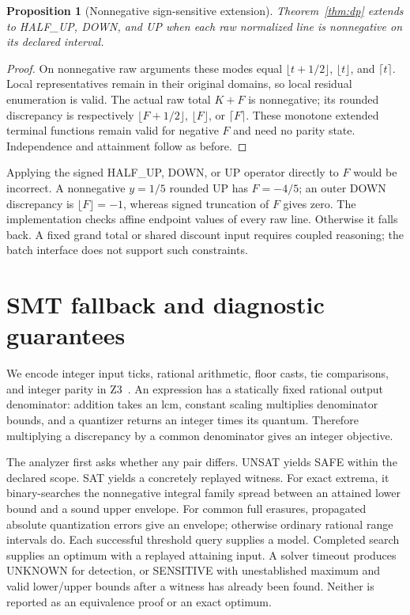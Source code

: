 \documentclass[11pt]{article}
\newtheorem{proposition}[theorem]{Proposition}
\begin{document}
\begin{proposition}[Nonnegative sign-sensitive extension]\label{prop:positive}
Theorem~\ref{thm:dp} extends to HALF\_UP, DOWN, and UP when each raw normalized line is nonnegative on its declared interval.
\end{proposition}
\begin{proof}
On nonnegative raw arguments these modes equal $\lfloor t+1/2\rfloor$, $\lfloor t\rfloor$, and $\lceil t\rceil$. Local representatives remain in their original domains, so local residual enumeration is valid. The actual raw total $K+F$ is nonnegative; its rounded discrepancy is respectively $\lfloor F+1/2\rfloor$, $\lfloor F\rfloor$, or $\lceil F\rceil$. These monotone extended terminal functions remain valid for negative $F$ and need no parity state. Independence and attainment follow as before.
\end{proof}
Applying the signed HALF\_UP, DOWN, or UP operator directly to $F$ would be incorrect. A nonnegative $y=1/5$ rounded UP has $F=-4/5$; an outer DOWN discrepancy is $\lfloor F\rfloor=-1$, whereas signed truncation of $F$ gives zero. The implementation checks affine endpoint values of every raw line. Otherwise it falls back. A fixed grand total or shared discount input requires coupled reasoning; the batch interface does not support such constraints.

\section{SMT fallback and diagnostic guarantees}
We encode integer input ticks, rational arithmetic, floor casts, tie comparisons, and integer parity in Z3~\citep{z32008}. An expression has a statically fixed rational output denominator: addition takes an lcm, constant scaling multiplies denominator bounds, and a quantizer returns an integer times its quantum. Therefore multiplying a discrepancy by a common denominator gives an integer objective.

The analyzer first asks whether any pair differs. UNSAT yields SAFE within the declared scope. SAT yields a concretely replayed witness. For exact extrema, it binary-searches the nonnegative integral family spread between an attained lower bound and a sound upper envelope. For common full erasures, propagated absolute quantization errors give an envelope; otherwise ordinary rational range intervals do. Each successful threshold query supplies a model. Completed search supplies an optimum with a replayed attaining input. A solver timeout produces UNKNOWN for detection, or SENSITIVE with unestablished maximum and valid lower/upper bounds after a witness has already been found. Neither is reported as an equivalence proof or an exact optimum.
\end{document}
